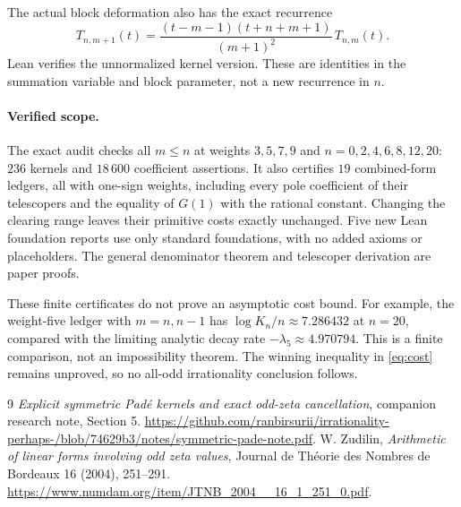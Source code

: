 \documentclass[11pt]{article}
\begin{document}
The actual block deformation also has the exact recurrence
\[
 T_{n,m+1}(t)=
 \frac{(t-m-1)(t+n+m+1)}{(m+1)^2}\,T_{n,m}(t).
\]
Lean verifies the unnormalized kernel version. These are identities in the
summation variable and block parameter, not a new recurrence in $n$.

\paragraph{Verified scope.}
The exact audit checks all $m\le n$ at weights $3,5,7,9$ and
$n=0,2,4,6,8,12,20$: $236$ kernels and $18\,600$ coefficient assertions.
It also certifies $19$ combined-form ledgers, all with one-sign weights,
including every pole coefficient of their telescopers and the equality
of $G(1)$ with the rational constant. Changing the clearing range leaves
their primitive costs exactly unchanged. Five new Lean foundation
reports use only standard foundations, with no added axioms or placeholders.
The general denominator theorem and telescoper derivation are paper proofs.

These finite certificates do not prove an asymptotic cost bound. For example,
the weight-five ledger with $m=n,n-1$ has
$\log K_n/n\approx7.286432$ at $n=20$, compared with the limiting analytic
decay rate $-\lambda_5\approx4.970794$. This is a finite comparison, not an
impossibility theorem. The winning inequality in \eqref{eq:cost} remains
unproved, so no all-odd irrationality conclusion follows.

\begin{thebibliography}{9}
\small
{}
\emph{Explicit symmetric Pad\'e kernels and exact odd-zeta cancellation},
companion research note, Section 5.
\url{https://github.com/ranbirsurii/irrationality-perhaps-/blob/74629b3/notes/symmetric-pade-note.pdf}.
W. Zudilin, \emph{Arithmetic of linear forms involving odd zeta values},
Journal de Th\'eorie des Nombres de Bordeaux 16 (2004), 251--291.
\url{https://www.numdam.org/item/JTNB_2004__16_1_251_0.pdf}.
\end{thebibliography}
\end{document}
